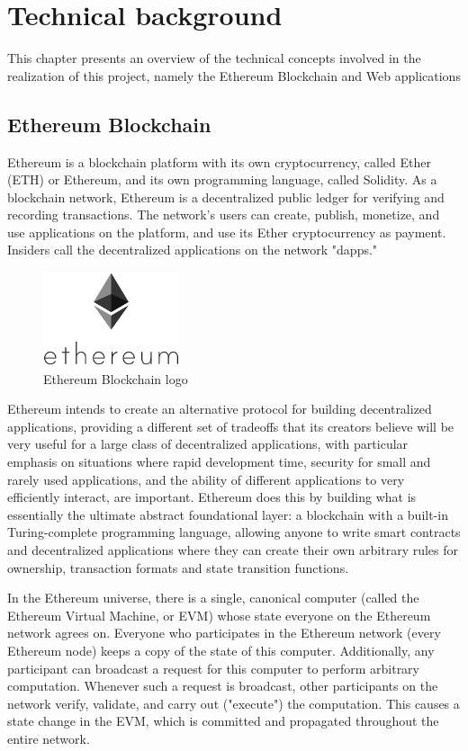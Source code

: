 \chapter{Technical background}
This chapter presents an overview of the technical concepts involved in the realization of this project, namely the Ethereum Blockchain and Web applications
\section{Ethereum Blockchain}
Ethereum is a blockchain platform with its own \gls{cryptocurrency}, called Ether (ETH) or Ethereum, and its own programming language, called Solidity. As a blockchain network, Ethereum is a decentralized public ledger for verifying and recording transactions. The network's users can create, publish, monetize, and use applications on the platform, and use its Ether cryptocurrency as payment. Insiders call the decentralized applications on the network "dapps."

\begin{figure}
	\vspace{-10pt}
	\includegraphics[width=4cm]{images/chapter2/ethereum.png}
	\vspace{-10pt}
	\caption{{\footnotesize Ethereum Blockchain logo}}
\end{figure}

Ethereum intends to create an alternative protocol for building decentralized applications, providing a different set of tradeoffs that its creators believe will be very useful for a large class of decentralized applications, with particular emphasis on situations where rapid development time, security for small and rarely used applications, and the ability of different applications to very efficiently interact, are important. Ethereum does this by building what is essentially the ultimate abstract foundational layer: a blockchain with a built-in Turing-complete programming language, allowing anyone to write smart contracts and decentralized applications where they can create their own arbitrary rules for ownership, transaction formats and state transition functions.

In the Ethereum universe, there is a single, canonical computer (called the Ethereum Virtual Machine, or \acrshort{EVM}) whose state everyone on the Ethereum network agrees on. Everyone who participates in the Ethereum network (every Ethereum node) keeps a copy of the state of this computer. Additionally, any participant can broadcast a request for this computer to perform arbitrary computation. Whenever such a request is broadcast, other participants on the network verify, validate, and carry out ("execute") the computation. This causes a state change in the EVM, which is committed and propagated throughout the entire network.

